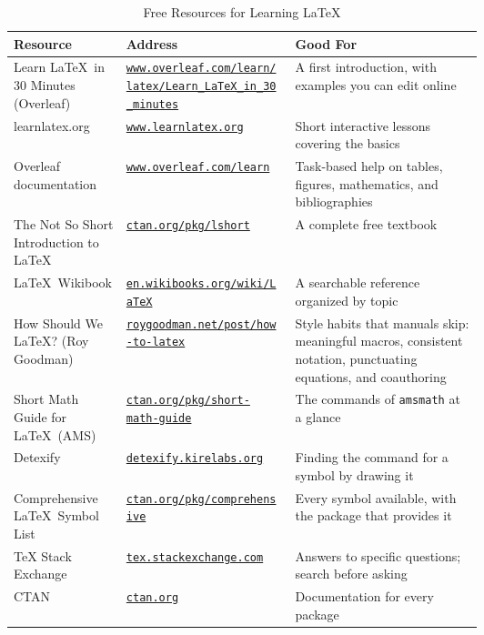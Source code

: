 \begin{table}[htbp]
\centering
\caption{Free Resources for Learning \LaTeX}
\label{table:latexresources}
\begin{tabularx}{\linewidth}{|>{\raggedright\arraybackslash}p{0.24\linewidth}|>{\raggedright\arraybackslash}p{0.36\linewidth}|>{\raggedright\arraybackslash}X|}
\hline
\textbf{Resource} & \textbf{Address} & \textbf{Good For} \\
\hline
Learn \LaTeX\ in 30 Minutes (Overleaf) & \href{https://www.overleaf.com/learn/latex/Learn_LaTeX_in_30_minutes}{\nolinkurl{www.overleaf.com/learn/latex/Learn_LaTeX_in_30_minutes}} & A first introduction, with examples you can edit online \\
\hline
learnlatex.org & \href{https://www.learnlatex.org}{\nolinkurl{www.learnlatex.org}} & Short interactive lessons covering the basics \\
\hline
Overleaf documentation & \href{https://www.overleaf.com/learn}{\nolinkurl{www.overleaf.com/learn}} & Task-based help on tables, figures, mathematics, and bibliographies \\
\hline
The Not So Short Introduction to \LaTeX & \href{https://ctan.org/pkg/lshort}{\nolinkurl{ctan.org/pkg/lshort}} & A complete free textbook \\
\hline
\LaTeX\ Wikibook & \href{https://en.wikibooks.org/wiki/LaTeX}{\nolinkurl{en.wikibooks.org/wiki/LaTeX}} & A searchable reference organized by topic \\
\hline
How Should We \LaTeX? (Roy Goodman) & \href{https://roygoodman.net/post/how-to-latex/}{\nolinkurl{roygoodman.net/post/how-to-latex}} & Style habits that manuals skip: meaningful macros, consistent notation, punctuating equations, and coauthoring \\
\hline
Short Math Guide for \LaTeX\ (AMS) & \href{https://ctan.org/pkg/short-math-guide}{\nolinkurl{ctan.org/pkg/short-math-guide}} & The commands of \texttt{amsmath} at a glance \\
\hline
Detexify & \href{https://detexify.kirelabs.org}{\nolinkurl{detexify.kirelabs.org}} & Finding the command for a symbol by drawing it \\
\hline
Comprehensive \LaTeX\ Symbol List & \href{https://ctan.org/pkg/comprehensive}{\nolinkurl{ctan.org/pkg/comprehensive}} & Every symbol available, with the package that provides it \\
\hline
TeX Stack Exchange & \href{https://tex.stackexchange.com}{\nolinkurl{tex.stackexchange.com}} & Answers to specific questions; search before asking \\
\hline
CTAN & \href{https://ctan.org}{\nolinkurl{ctan.org}} & Documentation for every package \\
\hline
\end{tabularx}
\end{table}
